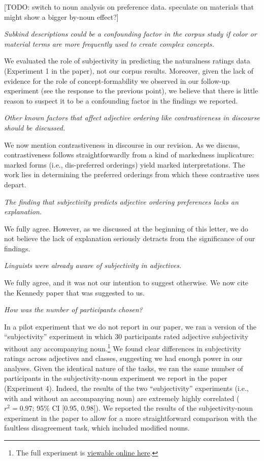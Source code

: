 \documentclass[12pt]{article}
\begin{document}
[TODO: switch to noun analysis on preference data. speculate on materials that might show a bigger by-noun effect?]

\item  \emph{Subkind descriptions could be a confounding factor in the corpus study if color or material terms are more frequently used to create complex concepts.}

We evaluated the role of subjectivity in predicting the naturalness ratings data (Experiment 1 in the paper), not our corpus results. Moreover, given the lack of evidence for the role of concept-formability we observed in our follow-up experiment (see the response to the previous point), we believe that there is little reason to suspect it to be a confounding factor in the findings we reported. 



\item \emph{Other known factors that affect adjective ordering like contrastiveness in discourse should be discussed.}

We now mention contrastiveness in discourse in our revision. As we discuss, contrastiveness follows straightforwardly from a kind of markedness implicature: marked forms (i.e., dis-preferred orderings) yield marked interpretations. The work lies in determining the preferred orderings from which these contrastive uses depart.


\item \emph{The finding that subjectivity predicts adjective ordering preferences lacks an explanation.}

We fully agree. However, as we discussed at the beginning of this letter, we do not believe the lack of explanation seriously detracts from the significance of our findings.


\item \emph{Linguists were already aware of subjectivity in adjectives.}

We fully agree, and it was not our intention to suggest otherwise. We now cite the Kennedy paper that was suggested to us.


\item \emph{How was the number of participants chosen?}

In a pilot experiment that we do not report in our paper, we ran a version of the ``subjectivity'' experiment in which 30 participants rated adjective subjectivity without any accompanying noun.\footnote{The full experiment is \href{http://web.stanford.edu/~scontras/adjective_ordering/experiments/6-subjectivity/subjectivity.html}{viewable online here}.} We found clear differences in subjectivity ratings across adjectives and classes, suggesting we had enough power in our analyses. 
Given the identical nature of the tasks, we ran the same number of participants in the subjectivity-noun experiment we report in the paper (Experiment 4). Indeed, the results of the two ``subjectivity'' experiments (i.e., with and without an accompanying noun) are extremely highly correlated ($r^2=0.97$; 95\% CI [0.95,  0.98]). We reported the results of the subjectivity-noun experiment in the paper to allow for a more straightforward comparison with the faultless disagreement task, which included modified nouns.
\end{document}
